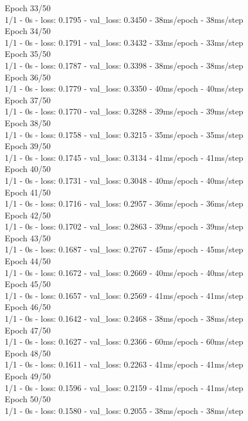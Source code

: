 Epoch 33/50 \\
1/1 - 0s - loss: 0.1795 - val\_loss: 0.3450 - 38ms/epoch - 38ms/step \\
Epoch 34/50 \\
1/1 - 0s - loss: 0.1791 - val\_loss: 0.3432 - 33ms/epoch - 33ms/step \\ 
Epoch 35/50 \\
1/1 - 0s - loss: 0.1787 - val\_loss: 0.3398 - 38ms/epoch - 38ms/step \\
Epoch 36/50 \\
1/1 - 0s - loss: 0.1779 - val\_loss: 0.3350 - 40ms/epoch - 40ms/step \\
Epoch 37/50 \\
1/1 - 0s - loss: 0.1770 - val\_loss: 0.3288 - 39ms/epoch - 39ms/step \\
Epoch 38/50 \\
1/1 - 0s - loss: 0.1758 - val\_loss: 0.3215 - 35ms/epoch - 35ms/step \\
Epoch 39/50 \\
1/1 - 0s - loss: 0.1745 - val\_loss: 0.3134 - 41ms/epoch - 41ms/step \\
Epoch 40/50 \\
1/1 - 0s - loss: 0.1731 - val\_loss: 0.3048 - 40ms/epoch - 40ms/step \\
Epoch 41/50 \\
1/1 - 0s - loss: 0.1716 - val\_loss: 0.2957 - 36ms/epoch - 36ms/step \\
Epoch 42/50 \\
1/1 - 0s - loss: 0.1702 - val\_loss: 0.2863 - 39ms/epoch - 39ms/step \\
Epoch 43/50 \\
1/1 - 0s - loss: 0.1687 - val\_loss: 0.2767 - 45ms/epoch - 45ms/step \\
Epoch 44/50 \\
1/1 - 0s - loss: 0.1672 - val\_loss: 0.2669 - 40ms/epoch - 40ms/step \\
Epoch 45/50 \\
1/1 - 0s - loss: 0.1657 - val\_loss: 0.2569 - 41ms/epoch - 41ms/step \\
Epoch 46/50 \\
1/1 - 0s - loss: 0.1642 - val\_loss: 0.2468 - 38ms/epoch - 38ms/step \\
Epoch 47/50 \\
1/1 - 0s - loss: 0.1627 - val\_loss: 0.2366 - 60ms/epoch - 60ms/step \\
Epoch 48/50 \\
1/1 - 0s - loss: 0.1611 - val\_loss: 0.2263 - 41ms/epoch - 41ms/step \\
Epoch 49/50 \\
1/1 - 0s - loss: 0.1596 - val\_loss: 0.2159 - 41ms/epoch - 41ms/step \\
Epoch 50/50 \\
1/1 - 0s - loss: 0.1580 - val\_loss: 0.2055 - 38ms/epoch - 38ms/step \\

